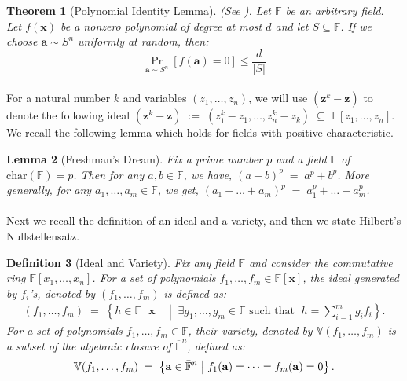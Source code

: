 \documentclass[11pt]{article}
\newtheorem{theorem}{Theorem}[section]
\newtheorem{lemma}[theorem]{Lemma}
\newtheorem{definition}[theorem]{Definition}
\newcommand{\setcond}[2]{\left\{ #1 \;\middle\vert\; #2 \right\}}
\newcommand{\F}{\mathbb{F}}
\begin{document}
\begin{theorem}[Polynomial Identity Lemma]\label{lem:ODLSZ}
(See \cite[Lemma 9.2.2]{GuruswamiRudraSudanCodingTheory}).
    Let $\F$ be an arbitrary field. Let $f(\mathbf{x})$ be a nonzero polynomial of degree at most $d$ and let $S \subseteq \F$. If we choose $\mathbf{a} \sim S^n$ uniformly at random, then: $$\Pr_{\mathbf{a}\sim S^n} [f(\mathbf{a}) = 0] \leq \frac{d}{|S|}$$ 
\end{theorem}

\paragraph{}For a natural number $k$ and variables $(z_{1},\ldots,z_{n})$, we will use $(\mathbf{z}^{k} - \mathbf{z})$ to denote the following ideal $(\mathbf{z}^{k} - \mathbf{z}) \; := \; (z_{1}^{k} - z_{1}, \ldots, z_{n}^{k} - z_{k}) \; \subseteq \; \F[z_{1},\ldots,z_{n}]$. We recall the following lemma which holds for fields with positive characteristic.\\

\begin{lemma}[Freshman's Dream]\label{lemma:freshman}
Fix a prime number $p$ and a field $\F$ of $\mathrm{char}(\F) = p$. Then for any $a, b \in \F$, we have, $(a+b)^{p} \; = \; a^{p} + b^{p}$. 
More generally, for any $a_{1},\ldots,a_{m} \in \F$, we get,
$(a_{1}+\ldots+a_{m})^{p} \; = \; a_{1}^{p} + \ldots + a_{m}^{p}$. 
\end{lemma}




\paragraph{}Next we recall the definition of an ideal and a variety, and then we state Hilbert's Nullstellensatz.

\begin{definition}[Ideal and Variety]
Fix any field $\F$ and consider the commutative ring $\F[x_{1},\ldots,x_{n}]$. For a set of polynomials $f_{1},\ldots,f_{m} \in \F[\mathbf{x}]$, the ideal generated by $f_{i}$'s, denoted by $(f_{1},\ldots,f_{m})$ is defined as:
\begin{align*}
    (f_{1},\ldots,f_{m}) \; = \; \setcond{h \in \F[\mathbf{x}]}{\exists g_{1},\ldots,g_{m} \in \F \text{ such that } \; h = \sum_{i=1}^{m} g_{i}f_{i} }.
\end{align*}
For a set of polynomials $f_{1},\ldots,f_{m} \in \F$, their variety, denoted by $\mathbb{V}(f_{1},\ldots,f_{m})$ is a subset of the algebraic closure of $\overline{\F}^{n}$, defined as:
\begin{align*}
    \mathbb{V}(f_{1},\ldots,f_{m}) \; = \; \setcond{\mathbf{a} \in \Bar{\F}^{n}}{f_{1}(\mathbf{a}) = \cdots = f_{m}(\mathbf{a}) = 0}.
\end{align*}
\end{definition}
\end{document}
